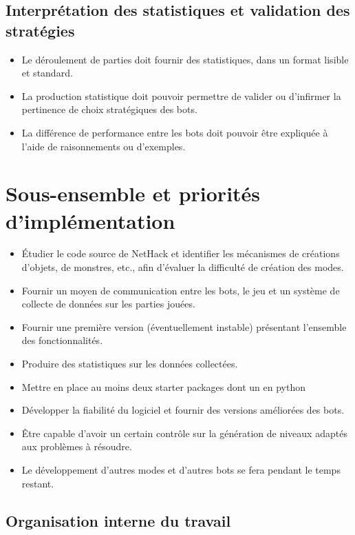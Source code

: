 \documentclass[12pt]{article}
\begin{document}
\subsection{Interprétation des statistiques et validation des stratégies}

\begin{itemize}
\item Le déroulement de parties doit fournir des statistiques, dans un format lisible et standard.
\item La production statistique doit pouvoir permettre de valider ou d'infirmer la pertinence de choix stratégiques des bots.
\item La différence de performance entre les bots doit pouvoir être expliquée à l'aide de raisonnements ou d'exemples.
\end{itemize}

\section{Sous-ensemble et priorités d'implémentation}

\begin{itemize}
\item Étudier le code source de NetHack et identifier les mécanismes de créations d'objets, de monstres, etc., afin d'évaluer la difficulté de création des modes.
\item Fournir un moyen de communication entre les bots, le jeu et un système de collecte de données sur les parties jouées.
\item Fournir une première version (éventuellement instable) présentant l'ensemble des fonctionnalités.
\item Produire des statistiques sur les données collectées.
\item Mettre en place au moins deux starter packages dont un en python
\item Développer la fiabilité du logiciel et fournir des versions améliorées des bots.
\item Être capable d'avoir un certain contrôle sur la génération de niveaux adaptés aux problèmes à résoudre.
\item Le développement d'autres modes et d'autres bots se fera pendant le temps restant.
\end{itemize}

\subsection{Organisation interne du travail}
\end{document}
